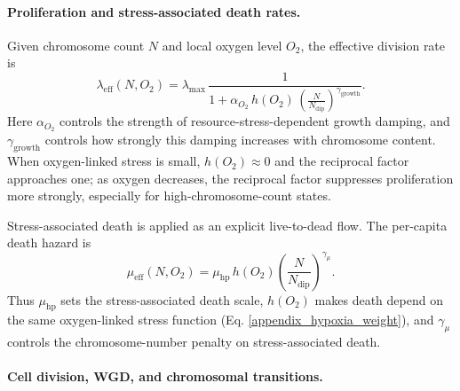 \documentclass[11pt]{article}
\begin{document}
\paragraph{Proliferation and stress-associated death rates.}

Given chromosome count $N$ and local oxygen level $O_2$, the effective division rate is
\begin{equation}
\lambda_{\mathrm{eff}}(N,O_2)
=
\lambda_{\max}\,
\frac{1}{1+\alpha_{O_2}\,h(O_2)\,
\left(\frac{N}{N_{\mathrm{dip}}}\right)^{\gamma_{\mathrm{growth}}}}.
\label{eq:appendix_lambda_eff_soft}
\end{equation}
Here $\alpha_{O_2}$ controls the strength of resource-stress-dependent growth damping, and $\gamma_{\mathrm{growth}}$ controls how strongly this damping increases with chromosome content. When oxygen-linked stress is small, $h(O_2)\approx 0$ and the reciprocal factor approaches one; as oxygen decreases, the reciprocal factor suppresses proliferation more strongly, especially for high-chromosome-count states.

Stress-associated death is applied as an explicit live-to-dead flow. The per-capita death hazard is
\begin{equation}
\mu_{\mathrm{eff}}(N,O_2)
=
\mu_{\mathrm{hp}}\,
h(O_2)
\left(\frac{N}{N_{\mathrm{dip}}}\right)^{\gamma_\mu}.
\label{eq:appendix_mu_soft}
\end{equation}
Thus $\mu_{\mathrm{hp}}$ sets the stress-associated death scale, $h(O_2)$ makes death depend on the same oxygen-linked stress function (Eq. \eqref{appendix_hypoxia_weight}), and $\gamma_\mu$ controls the chromosome-number penalty on stress-associated death.

\paragraph{Cell division, WGD, and chromosomal transitions.}
\end{document}
